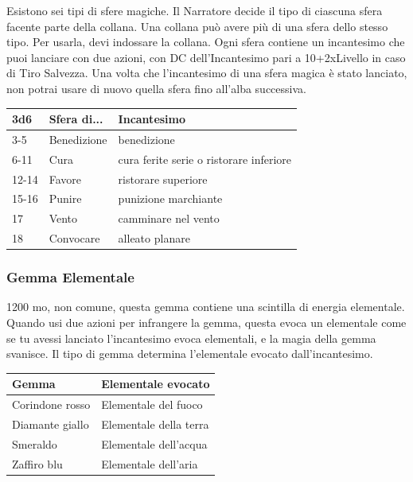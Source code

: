 \begin{multicols}{2}
	Esistono sei tipi di sfere magiche. Il Narratore decide il tipo di ciascuna sfera facente parte della collana. Una collana può avere più di una sfera dello stesso tipo. Per usarla, devi indossare la collana. Ogni sfera contiene un incantesimo che puoi lanciare con due azioni, con DC dell'Incantesimo pari a 10+2xLivello in caso di Tiro Salvezza. Una volta che l'incantesimo di una sfera magica è stato lanciato, non potrai usare di nuovo quella sfera fino all'alba successiva.

	\medskip

	\begin{tabularx}{0.45\textwidth}{llX}
		\textbf{3d6} &\textbf{Sfera di...} &\textbf{Incantesimo}\\
		\hline
		3-5 &Benedizione &benedizione\\
		6-11& Cura &cura ferite serie o ristorare inferiore\\
		12-14 &Favore& ristorare superiore\\
		15-16& Punire &punizione marchiante\\
		17 &Vento& camminare nel vento\\
		18 &Convocare &alleato planare\\
	\end{tabularx}


	\subsubsection*{Gemma Elementale}
	1200 mo, non comune, questa gemma contiene una scintilla di energia elementale. Quando usi due azioni per infrangere la gemma, questa evoca un elementale come se tu avessi lanciato l'incantesimo evoca elementali, e la magia della gemma svanisce. Il tipo di gemma determina l'elementale evocato dall'incantesimo.

	\medskip

	\begin{tabular}{ll}
		\textbf{Gemma} &\textbf{Elementale evocato}\\
		\hline
		Corindone rosso& Elementale del fuoco\\
		Diamante giallo& Elementale della terra\\
		Smeraldo &Elementale dell'acqua\\
		Zaffiro blu&Elementale dell'aria\\
	\end{tabular}

	\medskip


\end{multicols}
